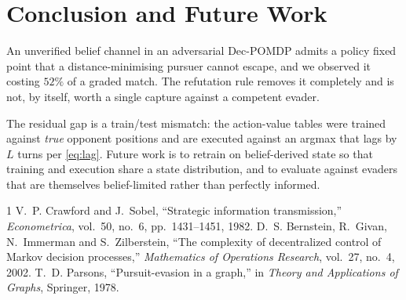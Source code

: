 \documentclass[conference]{IEEEtran}
\begin{document}
\section{Conclusion and Future Work}

An unverified belief channel in an adversarial Dec-POMDP admits a policy fixed
point that a distance-minimising pursuer cannot escape, and we observed it
costing $52\%$ of a graded match. The refutation rule removes it completely
and is not, by itself, worth a single capture against a competent evader.

The residual gap is a train/test mismatch: the action-value tables were
trained against \emph{true} opponent positions and are executed against an
argmax that lags by $L$ turns per \eqref{eq:lag}. Future work is to retrain on
belief-derived state so that training and execution share a state
distribution, and to evaluate against evaders that are themselves
belief-limited rather than perfectly informed.

\begin{thebibliography}{1}
 V.~P. Crawford and J.~Sobel, ``Strategic information
transmission,'' \emph{Econometrica}, vol.~50, no.~6, pp.~1431--1451, 1982.
 D.~S. Bernstein, R.~Givan, N.~Immerman and S.~Zilberstein,
``The complexity of decentralized control of Markov decision processes,''
\emph{Mathematics of Operations Research}, vol.~27, no.~4, 2002.
 T.~D. Parsons, ``Pursuit-evasion in a graph,'' in
\emph{Theory and Applications of Graphs}, Springer, 1978.
\end{thebibliography}
\end{document}
